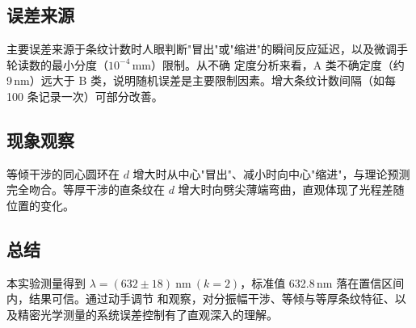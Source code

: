 \documentclass[UTF8]{article}
\begin{document}
	 \subsection*{误差来源}
	 主要误差来源于条纹计数时人眼判断"冒出"或"缩进"的瞬间反应延迟，以及微调手轮读数的最小分度（$10^{-4}$\,mm）限制。从不确
	 定度分析来看，A 类不确定度（约 9\,nm）远大于 B 类，说明随机误差是主要限制因素。增大条纹计数间隔（如每 100
	 条记录一次）可部分改善。
	 
	 \subsection*{现象观察}
	 等倾干涉的同心圆环在 $d$ 增大时从中心"冒出"、减小时向中心"缩进"，与理论预测完全吻合。等厚干涉的直条纹在 $d$
	 增大时向劈尖薄端弯曲，直观体现了光程差随位置的变化。
	 
	 \subsection*{总结}
	 本实验测量得到 $\lambda = (632 \pm 18)\ \mathrm{nm}\ (k = 2)$，标准值 632.8\,nm 落在置信区间内，结果可信。通过动手调节
	 和观察，对分振幅干涉、等倾与等厚条纹特征、以及精密光学测量的系统误差控制有了直观深入的理解。
\end{document}
